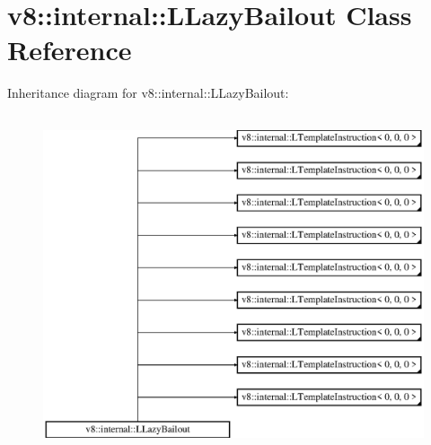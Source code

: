 \hypertarget{classv8_1_1internal_1_1_l_lazy_bailout}{}\section{v8\+:\+:internal\+:\+:L\+Lazy\+Bailout Class Reference}
\label{classv8_1_1internal_1_1_l_lazy_bailout}
Inheritance diagram for v8\+:\+:internal\+:\+:L\+Lazy\+Bailout\+:\begin{figure}[H]
\begin{center}
\leavevmode
\includegraphics[height=10.000000cm]{classv8_1_1internal_1_1_l_lazy_bailout}
\end{center}
\end{figure}
